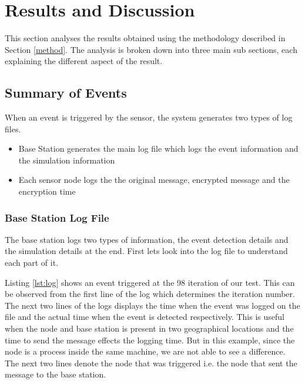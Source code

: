 \documentclass[conference]{IEEEtran}
\begin{document}
	\section{Results and Discussion}
	
	This section analyses the results obtained using the methodology described in Section \ref{method}. The analysis is broken down into three main sub sections, each explaining the different aspect of the result.
	
	\subsection{Summary of Events}
	
	When an event is triggered by the sensor, the system generates two types of log files.

	\begin{itemize}
		\item Base Station generates the main log file which logs the event information and the simulation information
		\item Each sensor node logs the the original message, encrypted message and the encryption time
	\end{itemize}

	\subsubsection{Base Station Log File}
	
	The base station logs two types of information, the event detection details and the simulation details at the end. First lets look into the log file to understand each part of it. 
	
	Listing \ref{lst:log} shows an event triggered at the 98 iteration of our test. This can be observed from the first line of the log which determines the iteration number. The next two lines of the logs displays the time when the event was logged on the file and the actual time when the event is detected respectively. This is useful when the node and base station is present in two geographical locations and the time to send the message effects the logging time. But in this example, since the node is a process inside the same machine, we are not able to see a difference. The next two lines denote the node that was triggered i.e. the node that sent the message to the base station.
	
\end{document}
